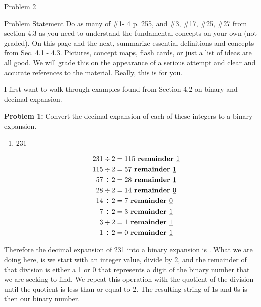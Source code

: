 \begin{problem}{Problem 2}
    \begin{statement}{Problem Statement}
        Do as many of \#1- 4 p. 255, and \#3, \#17, \#25, \#27 from section 4.3 as you need to understand the fundamental concepts on your own (not graded). On this page and the next, summarize 
        essential definitions and concepts from Sec. 4.1 - 4.3. Pictures, concept maps, flash cards, or just a list of ideas are all good. We will grade this on the appearance of a serious attempt 
        and clear and accurate references to the material. Really, this is for you.
    \end{statement}

    \begin{Highlight}[Solution]
        I first want to walk through examples found from Section 4.2 on binary and decimal expansion. \vspace*{1em}

        \noindent \textbf{Problem 1:} Convert the decimal expansion of each of these integers to a binary expansion.

        \begin{enumerate}[label = (\alph*)]
            \item 231
            
            \begin{align*}
                231 \div 2 & = 115 \text{ \textbf{remainder }} \underbar{1} \\
                115 \div 2 & = 57 \text{ \textbf{remainder }} \underbar{1} \\
                57 \div 2 & = 28 \text{ \textbf{remainder }} \underbar{1} \\
                28 \div 2 & = 14 \text{ \textbf{remainder }} \underbar{0} \\
                14 \div 2 & = 7 \text{ \textbf{remainder }} \underbar{0} \\
                7 \div 2 & = 3 \text{ \textbf{remainder }} \underbar{1} \\
                3 \div 2 & = 1 \text{ \textbf{remainder }} \underbar{1} \\
                1 \div 2 & = 0 \text{ \textbf{remainder }} \underbar{1}
            \end{align*}
        \end{enumerate}
        Therefore the decimal expansion of 231 into a binary expansion is . What we are doing here, is we start with an integer value, divide by 2, and the remainder of that division
        is either a 1 or 0 that represents a digit of the binary number that we are seeking to find. We repeat this operation with the quotient of the division until the quotient is less than or
        equal to 2. The resulting string of 1s and 0s is then our binary number. \vspace*{1em}


\end{Highlight}
\end{problem}
